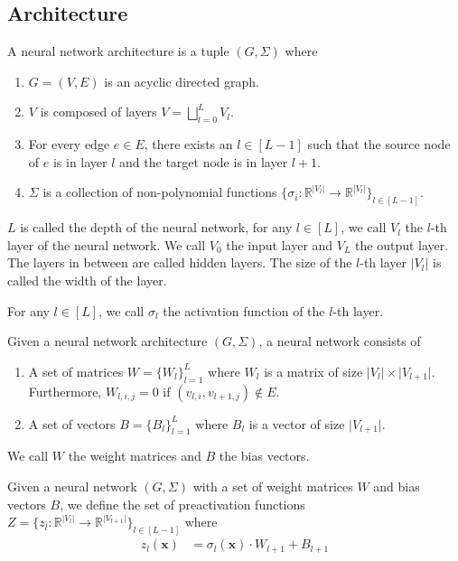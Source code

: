 \subsection{Architecture}
\begin{definition}
    A neural network architecture is a tuple $(G,\Sigma)$ where
    \begin{enumerate}
        \item $G=(V,E)$ is an acyclic directed graph.
        \item $V$ is composed of layers $V=\bigsqcup^L_{l=0} V_l$.
        \item For every edge $e\in E$, there exists an $l\in[L-1]$ such that 
        the source node of $e$ is in layer 
        $l$ and the target node is in layer $l+1$.
        \item $\Sigma$ is a collection of non-polynomial
        functions
        $\{\sigma_{i}:\mathbb{R}^{\lvert V_{l}\rvert}\to\mathbb{R}^{\lvert V_{l}\rvert}\}_{l\in [L-1]}$.
    \end{enumerate}
    $L$ is called the depth of the neural network,
    for any $l\in[L]$, we call $V_l$ the $l$-th layer of the neural network.
    We call $V_0$ the input layer and $V_L$ the output layer.
    The layers in between are called hidden layers.
    The size of the $l$-th layer $\lvert V_l \rvert$ is called the width of the layer.

    For any $l\in[L]$, we call $\sigma_l$ the activation function of the $l$-th layer.
\end{definition}
\begin{definition}
    Given a neural network architecture $(G,\Sigma)$,
    a neural network consists of
    \begin{enumerate}
        \item A set of matrices $W=\{W_l\}_{l=1}^L$ where $W_l$ is a matrix of size
        $\lvert V_l\rvert\times\lvert V_{l+1}\rvert$. Furthermore, $W_{l,i,j}=0$ if
        $(v_{l,i},v_{l+1,j})\not\in E$.
        \item A set of vectors $B=\{B_l\}_{l=1}^L$ where $B_l$ is a vector of size
        $\lvert V_{l+1}\rvert$.
    \end{enumerate}
    We call $W$ the weight matrices and $B$ the bias vectors.
\end{definition}
Given a neural network $(G,\Sigma)$ with a set of weight matrices $W$ and bias vectors $B$,
we define the set of preactivation functions $Z=\{z_l:\mathbb{R}^{\lvert V_l\rvert}\to\mathbb{R}^{\lvert V_{l+1}\rvert}\}_{l\in[L-1]}$ where
\begin{align*}
    z_{l}(\mathbf{x})&= \sigma_{l}(\mathbf{x})\cdot W_{l+1} +B_{l+1}
\end{align*}

